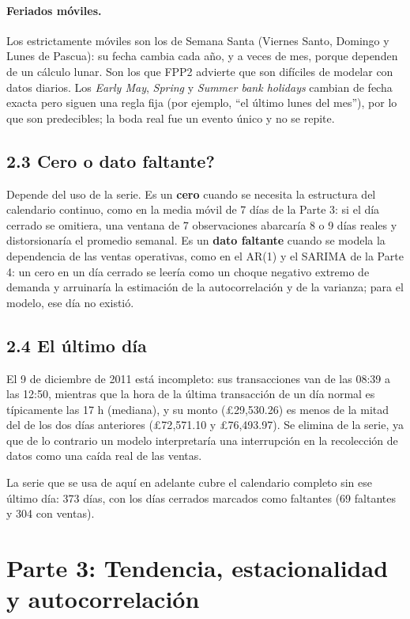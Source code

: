 \documentclass[11pt]{article}
\begin{document}
\paragraph{Feriados m\'oviles.} Los estrictamente m\'oviles son los de Semana
Santa (Viernes Santo, Domingo y Lunes de Pascua): su fecha cambia cada a\~no,
y a veces de mes, porque dependen de un c\'alculo lunar. Son los que FPP2
advierte que son dif\'iciles de modelar con datos diarios. Los \emph{Early
May}, \emph{Spring} y \emph{Summer bank holidays} cambian de fecha exacta pero
siguen una regla fija (por ejemplo, ``el \'ultimo lunes del mes''), por lo que
son predecibles; la boda real fue un evento \'unico y no se repite.

\subsection*{2.3 \textquestiondown Cero o dato faltante?}
Depende del uso de la serie. Es un \textbf{cero} cuando se necesita la
estructura del calendario continuo, como en la media m\'ovil de 7 d\'ias de la
Parte 3: si el d\'ia cerrado se omitiera, una ventana de 7 observaciones
abarcar\'ia 8 o 9 d\'ias reales y distorsionar\'ia el promedio semanal. Es un
\textbf{dato faltante} cuando se modela la dependencia de las ventas
operativas, como en el AR(1) y el SARIMA de la Parte 4: un cero en un d\'ia
cerrado se leer\'ia como un choque negativo extremo de demanda y arruinar\'ia
la estimaci\'on de la autocorrelaci\'on y de la varianza; para el modelo, ese
d\'ia no existi\'o.

\subsection*{2.4 El \'ultimo d\'ia}
El 9 de diciembre de 2011 est\'a incompleto: sus transacciones van de las
08:39 a las 12:50, mientras que la hora de la \'ultima transacci\'on de un d\'ia
normal es t\'ipicamente las 17 h (mediana), y su monto (\pounds 29{,}530.26)
es menos de la mitad del de los dos d\'ias anteriores
(\pounds 72{,}571.10 y \pounds 76{,}493.97). Se elimina de la serie, ya que
de lo contrario un modelo interpretar\'ia una interrupci\'on en la
recolecci\'on de datos como una ca\'ida real de las ventas.

La serie que se usa de aqu\'i en adelante cubre el calendario completo
sin ese \'ultimo d\'ia: 373 d\'ias, con los d\'ias cerrados marcados como
faltantes (69 faltantes y 304 con ventas).

\section*{Parte 3: Tendencia, estacionalidad y autocorrelaci\'on}
\end{document}
